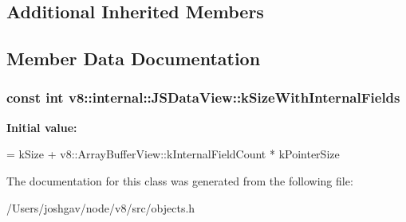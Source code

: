 \subsection*{Additional Inherited Members}


\subsection{Member Data Documentation}
\subsubsection[{\texorpdfstring{k\+Size\+With\+Internal\+Fields}{kSizeWithInternalFields}}]{\setlength{\rightskip}{0pt plus 5cm}const int v8\+::internal\+::\+J\+S\+Data\+View\+::k\+Size\+With\+Internal\+Fields\hspace{0.3cm}{\ttfamily [static]}}\hypertarget{classv8_1_1internal_1_1_j_s_data_view_a6966ba668404b7e75b9152dac18fc800}{}\label{classv8_1_1internal_1_1_j_s_data_view_a6966ba668404b7e75b9152dac18fc800}
{\bfseries Initial value\+:}
\begin{DoxyCode}
=
      kSize + v8::ArrayBufferView::kInternalFieldCount * kPointerSize
\end{DoxyCode}


The documentation for this class was generated from the following file\+:\begin{DoxyCompactItemize}
\item 
/\+Users/joshgav/node/v8/src/objects.\+h\end{DoxyCompactItemize}
